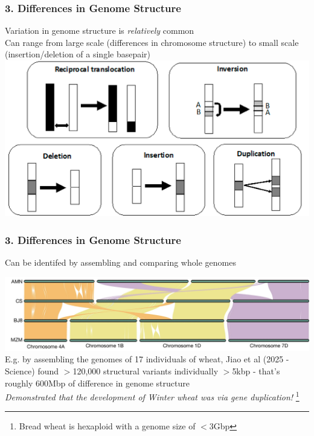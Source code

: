 \documentclass{beamer}
\newcommand\blfootnote[1]{%
	\begingroup
	\renewcommand\thefootnote{}\footnote{#1}%
	\addtocounter{footnote}{-1}%
	\endgroup
}
\begin{document}
\begin{frame}
	\frametitle{3. Differences in Genome Structure}
	Variation in genome structure is \textit{relatively} common\\
	\vspace{5pt}
	Can range from large scale (differences in chromosome structure) to small scale (insertion/deletion of a single basepair)\\
		\vspace{5pt}
		\includegraphics[keepaspectratio, width  = \textwidth]{img/structuralMutation}

\end{frame}

\begin{frame}
	\frametitle{3. Differences in Genome Structure}
Can be identifed by assembling and comparing whole genomes \\

	\vspace{5pt}

	\includegraphics[keepaspectratio, width  = \textwidth]{img/wheatPangenome}\\ \pause
	\vspace{15pt}
\scriptsize	E.g. by assembling the genomes of 17 individuals of wheat, Jiao et al (2025 - Science) found $>$120,000 structural variants individually $>$5kbp - that's roughly 600Mbp of difference in genome structure \\
\vspace{10pt}
	\textit{Demonstrated that the development of Winter wheat was via gene duplication!}
	\blfootnote{Bread wheat is hexaploid with a genome size of $<$3Gbp}
	
\end{frame}
	
\end{document}

